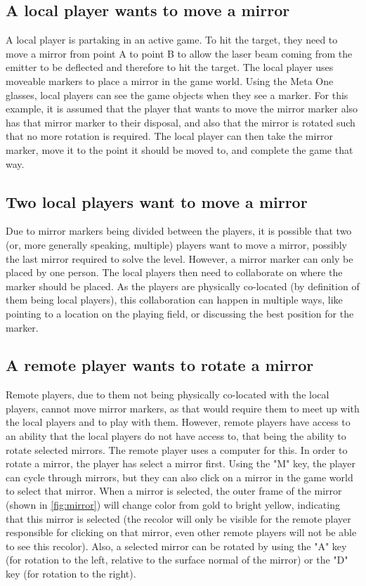 		\subsection{A local player wants to move a mirror} \label{ssec:localmovemirror}
			A local player is partaking in an active game. To hit the target, they
			need to move a mirror from point A to point B to allow the laser beam
			coming from the emitter to be deflected and therefore to hit the target.
			The local player uses moveable markers to place a mirror in the game
			world. Using the Meta One glasses, local players can see the game objects
			when they see a marker. For this example, it is assumed that the player that wants
			to move the mirror marker also has that mirror marker to their disposal,
			and also that the mirror is rotated such that no more rotation is required.
			The local player can then take the mirror marker, move it to the point
			it should be moved to, and complete the game that way.
			
		\subsection{Two local players want to move a mirror} \label{ssec:localmovemirrorcollab}
			Due to mirror markers being divided between the players, it is possible
			that two (or, more generally speaking, multiple) players want to move
			a mirror, possibly the last mirror required to solve the level. However,
			a mirror marker can only be placed by one person. The local players then
			need to collaborate on where the marker should be placed. As the players
			are physically co-located (by definition of them being local players),
			this collaboration can happen in multiple ways, like pointing to a 
			location on the playing field, or discussing the best position for the
			marker.
			
		\subsection{A remote player wants to rotate a mirror} \label{ssec:remoterotatemirror}
			Remote players, due to them not being physically co-located with the
			local players, cannot move mirror markers, as that would require them
			to meet up with the local players and to play with them. However, 
			remote players have access to an ability that the local players do
			not have access to, that being the ability to rotate selected mirrors.
			The remote player uses a computer for this. In order to rotate a mirror,
			the player has select a mirror first. Using the "M" key, the player can
			cycle through mirrors, but they can also click on a mirror in the game
			world to select that mirror. When a mirror is selected, the outer
			frame of the mirror (shown in \ref{fig:mirror}) will change color
			from gold to bright yellow, indicating that this mirror is selected
			(the recolor will only be visible for the remote player responsible
			for clicking on that mirror, even other remote players will not be
			able to see this recolor). Also, a selected mirror can be rotated by
			using the "A" key (for rotation to the left, relative to the surface
			normal of the mirror) or the "D" key (for rotation to the right).
		
